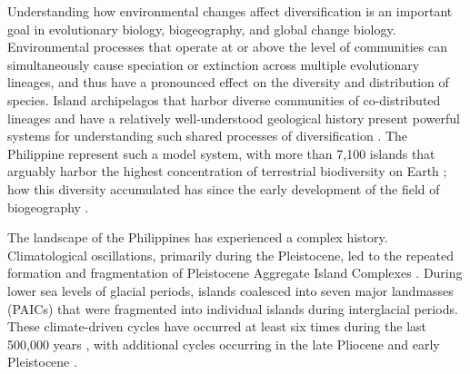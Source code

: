 
Understanding how environmental changes affect diversification is an important
goal in evolutionary biology, biogeography, and global change biology.
Environmental processes that operate at or above the level of communities can
simultaneously cause speciation or extinction across multiple evolutionary
lineages, and thus have a pronounced effect on the diversity and distribution
of species.
Island archipelagos that harbor diverse communities of co-distributed lineages
and have a relatively well-understood geological history present powerful
systems for understanding such shared processes of diversification
\citep{Gillespie2007,Losos2009,Vences2009,Rafe2013AREES}.
The Philippine  represent such a model system,
with more than 7,100 islands that arguably harbor the highest concentration of
terrestrial biodiversity on Earth
\citep{CatibogSinha2006,RafeDiesmos2009, Heaney1998,Rafe2013AREES};
how this diversity accumulated has  since the
early development of the field of biogeography
.

The landscape of the Philippines has experienced a complex history.
Climatological oscillations, primarily during the Pleistocene, led to the
repeated formation and fragmentation of Pleistocene Aggregate Island Complexes
\citep[PAICs;][]{Inger1954,Heaney1985,RafeDiesmos2001,RafeDiesmos2009,Esselstyn2009MPE,Siler2010,Rafe2013,Lomolino2016}.
During lower sea levels of glacial periods, islands coalesced into seven major
landmasses (PAICs) that were fragmented into individual islands during
interglacial periods.
These climate-driven cycles have occurred at least six times during the last
500,000 years \citep{Rohling1998,Siddall2003,Spratt2016}, with additional cycles
occurring in the late Pliocene and early Pleistocene
\citep{Haq1987,Miller2005}.

